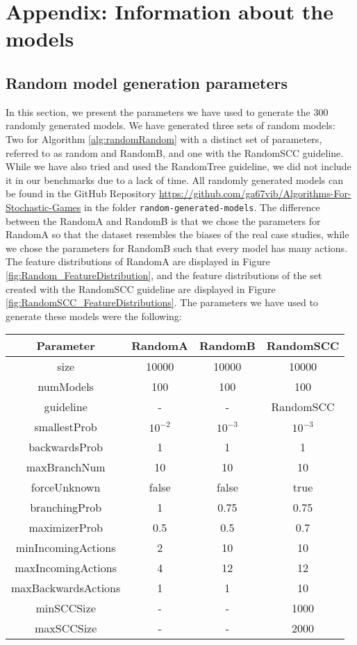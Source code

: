 \chapter{Appendix: Information about the models} \label{sec:appendix}

\section*{Random model generation parameters} \label{sec:GenParams}
In this section, we present the parameters we have used to generate the 300 randomly generated models. 
We have generated three sets of random models: Two for Algorithm \ref{alg:randomRandom} with a distinct set of parameters, referred to as random and RandomB, and one with the RandomSCC guideline.
While we have also tried and used the RandomTree guideline, we did not include it in our benchmarks due to a lack of time.
All randomly generated models can be found in the GitHub Repository \url{https://github.com/ga67vib/Algorithms-For-Stochastic-Games} in the folder \texttt{random-generated-models}.
The difference between the RandomA and RandomB is that we chose the parameters for RandomA so that the dataset resembles the biases of the real case studies,
while we chose the parameters for RandomB such that every model has many actions. 
The feature distributions of RandomA are displayed in Figure \ref{fig:Random_FeatureDistribution}, 
and the feature distributions of the set created with the RandomSCC guideline are displayed in Figure \ref{fig:RandomSCC_FeatureDistributions}.
The parameters we have used to generate these models were the following:
\begin{center}
	\begin{tabular}{| c | c c c |} 
	 \hline
	 Parameter & RandomA & RandomB & RandomSCC \\ [0.5ex] 
	 \hline\hline
	 size & 10000 & 10000 & 10000 \\
	 \hline
	 numModels & 100 & 100 & 100 \\
	 \hline
	 guideline & - & - & RandomSCC \\
	 \hline
	 smallestProb & $10^{-2}$ & $10^{-3}$ & $10^{-3}$ \\
	 \hline
	 backwardsProb & 1 & 1 & 1 \\ [1ex] 
	 \hline
	 maxBranchNum & 10 & 10 & 10 \\ [1ex] 
	 \hline
	 forceUnknown & false & false & true \\ [1ex] 
	 \hline
	 branchingProb & 1 & 0.75 & 0.75 \\ [1ex] 
	 \hline
	 maximizerProb & 0.5 & 0.5 & 0.7 \\ [1ex] 
	 \hline
	 minIncomingActions & 2 & 10 & 10 \\ [1ex] 
	 \hline
	 maxIncomingActions & 4 & 12 & 12 \\ [1ex] 
	 \hline
	 maxBackwardsActions & 1 & 1 & 10 \\ [1ex] 
	 \hline
	 minSCCSize & - & - & 1000 \\ [1ex] 
	 \hline
	 maxSCCSize & - & - & 2000 \\ [1ex] 
	 \hline
	\end{tabular}
\end{center}
	

